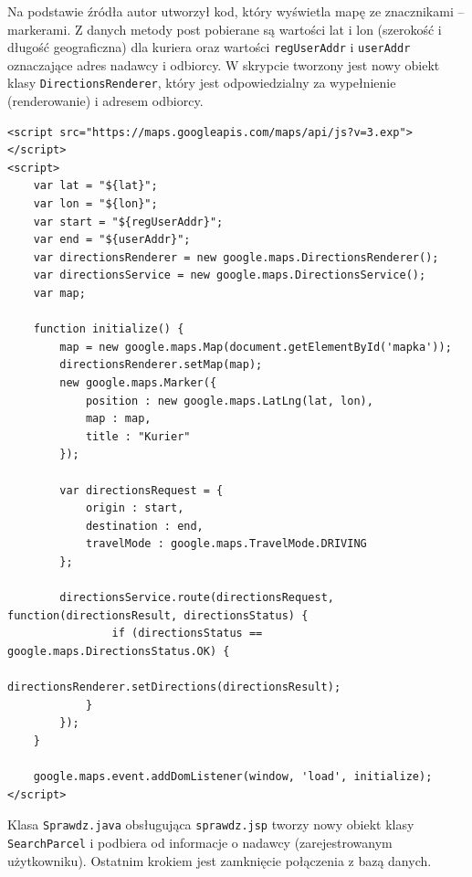 \documentclass[eng,printmode,oneside]{mgr}
\begin{document}
Na podstawie źródła \cite{developer.google.maps} autor utworzył kod,
który wyświetla mapę ze znacznikami -- markerami. Z danych metody post pobierane
są wartości lat i lon (szerokość i długość geograficzna) dla kuriera oraz wartości
\texttt{regUserAddr} i \texttt{userAddr} oznaczające adres nadawcy i odbiorcy. W
skrypcie tworzony jest nowy obiekt klasy \texttt{DirectionsRenderer}, który jest
odpowiedzialny za wypełnienie (renderowanie)
   i adresem odbiorcy.

\begin{lstlisting}[caption=Kod JavaScript'owy pobierający mapę z
serwera Google,label=lst:maps.JS] 
<script src="https://maps.googleapis.com/maps/api/js?v=3.exp"></script> 
<script>
	var lat = "${lat}";
	var lon = "${lon}";
	var start = "${regUserAddr}";
	var end = "${userAddr}";
	var directionsRenderer = new google.maps.DirectionsRenderer();
	var directionsService = new google.maps.DirectionsService();
	var map;

	function initialize() {
		map = new google.maps.Map(document.getElementById('mapka'));
		directionsRenderer.setMap(map);
		new google.maps.Marker({
			position : new google.maps.LatLng(lat, lon),
			map : map,
			title : "Kurier"
		});
		
		var directionsRequest = {
			origin : start,
			destination : end,
			travelMode : google.maps.TravelMode.DRIVING
		};
		
		directionsService.route(directionsRequest, function(directionsResult, directionsStatus) {
				if (directionsStatus == google.maps.DirectionsStatus.OK) {
					directionsRenderer.setDirections(directionsResult);
			}
		});
	}
	
	google.maps.event.addDomListener(window, 'load', initialize);
</script>
\end{lstlisting}

Klasa \texttt{Sprawdz.java} obsługująca \texttt{sprawdz.jsp} tworzy nowy obiekt
klasy \texttt{SearchParcel} i podbiera od 
  informacje o nadawcy
(zarejestrowanym użytkowniku). Ostatnim krokiem jest zamknięcie połączenia z bazą danych.
\end{document}
